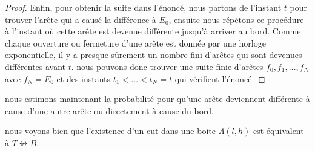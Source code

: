 \documentclass[titlepage,a4paper,12pt]{article}
\newcounter{def}
\newcounter{cor}
\newtheorem{cut}[def]{Définition}
\newtheorem{bcut}[cor]{Corollaire}
\begin{document}
\begin{proof}
Enfin, pour obtenir la suite dans l'énoncé, nous partons de l'instant $t$ pour trouver l'arête qui a causé la différence à $E_0$, ensuite nous répétons ce procédure à l'instant où cette arête est devenue différente jusqu'à arriver au bord. Comme chaque ouverture ou fermeture d'une arête est donnée par une horloge exponentielle, il y a presque sûrement un nombre fini d'arêtes qui sont devenues différentes avant $t$. nous pouvons donc trouver une suite finie d'arêtes $f_0,f_1,\dots, f_N$ avec $f_N = E_0$ et des instants $t_1<\dots< t_N = t$ qui vérifient l'énoncé.
\end{proof}

nous estimons maintenant la probabilité pour qu'une arête deviennent différente à cause d'une autre arête ou directement à cause du bord. 

\begin{comment}
\begin{cut}
Soit $\Lambda(l,h)$ une boîte de longueur $l$, un cut $C$ est un ensemble d'arête fermé dont le dual contient un chemin fermé de gauche à droite de $\Lambda(l,h)$. Un cut minimal est un cut dont l'ouverture d'un sous-ensemble produit un chemin ouvert de $T$ à $B$.
\end{cut}
\end{comment}
nous voyons bien que l'existence d'un cut dans une boite $\Lambda(l,h)$ est équivalent à $T\nleftrightarrow B$.

\end{document}
